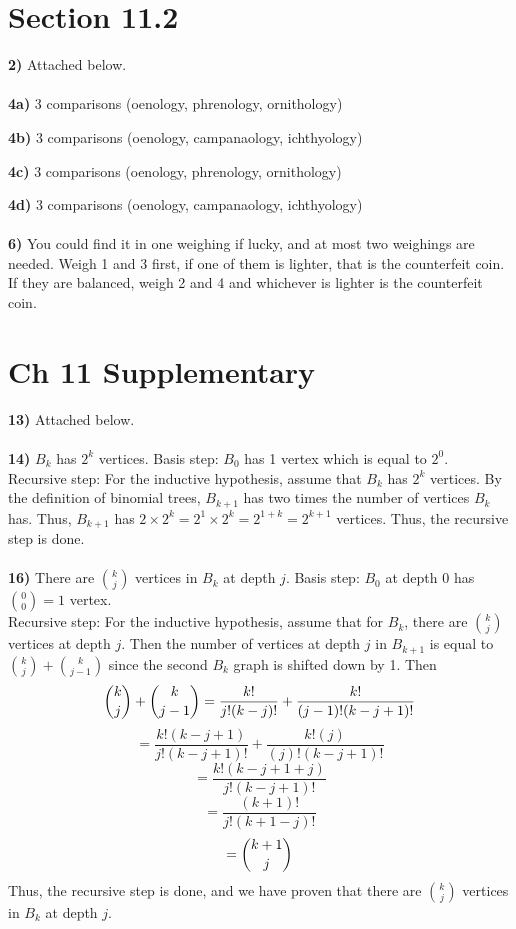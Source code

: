 \documentclass{article}
\begin{document}
\section*{Section 11.2}
\noindent\textbf{2)} Attached below.
\\\\\noindent\textbf{4a)} 3 comparisons (oenology, phrenology, ornithology)

\noindent\textbf{4b)} 3 comparisons (oenology, campanaology, ichthyology)

\noindent\textbf{4c)} 3 comparisons (oenology, phrenology, ornithology)

\noindent\textbf{4d)} 3 comparisons (oenology, campanaology, ichthyology)
\\\\\noindent\textbf{6)} You could find it in one weighing if lucky, and at most two weighings are needed. Weigh 1 and 3 first, if one of them is lighter, that is the counterfeit coin. If they are balanced, weigh 2 and 4 and whichever is lighter is the counterfeit coin.

\section*{Ch 11 Supplementary}
\noindent\textbf{13)} Attached below.
\\\\\noindent\textbf{14)} $B_k$ has $2^k$ vertices. Basis step: $B_0$ has 1 vertex which is equal to $2^0$. 
\\Recursive step: For the inductive hypothesis, assume that $B_k$ has $2^k$ vertices. By the definition of binomial trees, $B_{k+1}$ has two times the number of vertices $B_k$ has. Thus, $B_{k+1}$ has $2\times 2^k = 2^1\times 2^k = 2^{1+k} = 2^{k+1}$ vertices. Thus, the recursive step is done.
\\\\\noindent\textbf{16)} There are ${{k}\choose{j}}$ vertices in $B_k$ at depth $j$. Basis step: $B_0$ at depth 0 has ${{0}\choose{0}} = 1$ vertex. 
\\Recursive step: For the inductive hypothesis, assume that for $B_k$, there are ${{k}\choose{j}}$ vertices at depth $j$. Then the number of vertices at depth $j$ in $B_{k+1}$ is equal to ${{k}\choose{j}}+{{k}\choose{j-1}}$ since the second $B_k$ graph is shifted down by 1. Then 
\[\dbinom{k}{j}+\dbinom{k}{j-1} = \dfrac{k!}{j!(k-j)!}+\dfrac{k!}{(j-1)!(k-j+1)!}\]
\[ = \dfrac{k!(k-j+1)}{j!(k-j+1)!}+\dfrac{k!(j)}{(j)!(k-j+1)!}\]
\[ = \dfrac{k!(k-j+1+j)}{j!(k-j+1)!}\]
\[=\dfrac{(k+1)!}{j!(k+1-j)!}\]
\[= \dbinom{k+1}{j}\]
Thus, the recursive step is done, and we have proven that there are ${{k}\choose{j}}$ vertices in $B_k$ at depth $j$.
\end{document}
